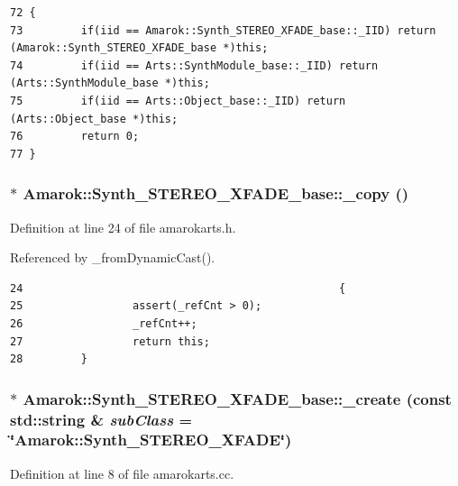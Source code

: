 \footnotesize\begin{verbatim}72 {
73         if(iid == Amarok::Synth_STEREO_XFADE_base::_IID) return (Amarok::Synth_STEREO_XFADE_base *)this;
74         if(iid == Arts::SynthModule_base::_IID) return (Arts::SynthModule_base *)this;
75         if(iid == Arts::Object_base::_IID) return (Arts::Object_base *)this;
76         return 0;
77 }
\end{verbatim}\normalsize 
{}
\subsubsection{$\ast$ Amarok::Synth\_\-STEREO\_\-XFADE\_\-base::\_\-copy ()\hspace{0.3cm}{\tt  [inline]}}\label{classAmarok_1_1Synth__STEREO__XFADE__base_Amarok_1_1Synth__STEREO__XFADE__stuba3}




Definition at line 24 of file amarokarts.h.

Referenced by \_\-from\-Dynamic\-Cast().



\footnotesize\begin{verbatim}24                                                 {
25                 assert(_refCnt > 0);
26                 _refCnt++;
27                 return this;
28         }
\end{verbatim}\normalsize 
{}
\subsubsection{ $\ast$ Amarok::Synth\_\-STEREO\_\-XFADE\_\-base::\_\-create (const std::string \& {\em sub\-Class} = \char`\"{}Amarok::Synth\_\-STEREO\_\-XFADE\char`\"{})\hspace{0.3cm}{\tt  [static]}}\label{classAmarok_1_1Synth__STEREO__XFADE__base_Amarok_1_1Synth__STEREO__XFADE__stube0}




Definition at line 8 of file amarokarts.cc.

